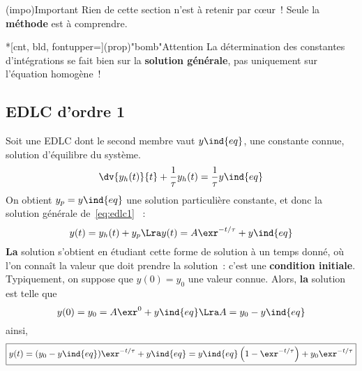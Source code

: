 \documentclass[a4paper, 11pt, garamond]{book}
\begin{document}
\begin{tcn}[cnt](impo){Important}
	Rien de cette section n'est à retenir par cœur~! Seule la \textbf{méthode} est
	à comprendre.
\end{tcn}
\begin{tcn}*[cnt, bld, fontupper=\Large](prop)"bomb"{Attention}
	La détermination des constantes d'intégrations se fait bien sur la
	\textbf{solution générale}, pas uniquement sur l'équation homogène~!
\end{tcn}

\subsection{EDLC d'ordre 1}
Soit une EDLC dont le second membre vaut $y\ind{eq}$, une constante connue,
solution d'équilibre du système.
\begin{equation}
	\dv{y_h(t)}{t} + \frac{1}{\tau} y_h(t) = \frac{1}{\tau}y\ind{eq}
	\label{eq:edlc1}
\end{equation}
On obtient $y_p = y\ind{eq}$ une solution particulière constante, et donc la
solution générale de~\eqref{eq:edlc1} ~:
\[
	y(t) = y_h(t) + y_p
	\Lra
	y(t) = A\exr^{-t/\tau} + y\ind{eq}
\]
\textbf{La} solution s'obtient en étudiant cette forme de solution à un temps
donné, où l'on connaît la valeur que doit prendre la solution~: c'est une
\textbf{condition initiale}. Typiquement, on suppose que $y(0) = y_0$ une valeur
connue. Alors, \textbf{la} solution est telle que
\[
	y(0) = y_0 = A\exr^{0} + y\ind{eq}
	\Lra
	A = y_0 - y\ind{eq}
\]
ainsi,
\[
	\boxed{
		y(t) =
		(y_0-y\ind{eq})\exr^{-t/\tau}+y\ind{eq} =
		y\ind{eq}\left(1-\exr^{-t/\tau}\right)+y_0 \exr^{-t/\tau}}
\]
\end{document}
